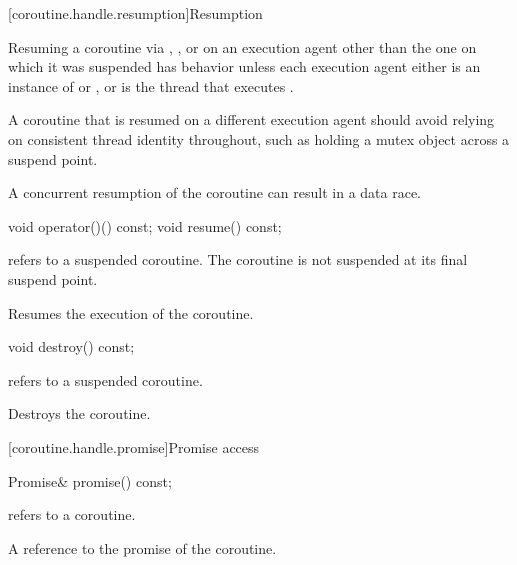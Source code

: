 [coroutine.handle.resumption]{Resumption}

\pnum
Resuming a coroutine via , , or 
on an execution agent other than the one on which it was suspended
has  behavior
unless
each execution agent either is
an instance of  or ,
or is the thread that executes .
\begin{note}
A coroutine that is resumed on a different execution agent should
avoid relying on consistent thread identity throughout, such as holding
a mutex object across a suspend point.
\end{note}
\begin{note}
A concurrent resumption of the coroutine can result in a data race.
\end{note}

%
%
\begin{itemdecl}
void operator()() const;
void resume() const;
\end{itemdecl}

\begin{itemdescr}
\pnum
\expects
{} refers to a suspended coroutine.
The coroutine is not suspended at its final suspend point.

\pnum
\effects
Resumes the execution of the coroutine.
\end{itemdescr}

%
\begin{itemdecl}
void destroy() const;
\end{itemdecl}

\begin{itemdescr}
\pnum
\expects
{} refers to a suspended coroutine.

\pnum
\effects
Destroys the coroutine.
\end{itemdescr}

[coroutine.handle.promise]{Promise access}

%
\begin{itemdecl}
Promise& promise() const;
\end{itemdecl}

\begin{itemdescr}
\pnum
\expects
{} refers to a coroutine.

\pnum
\returns
A reference to the promise of the coroutine.
\end{itemdescr}

